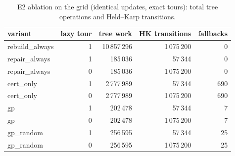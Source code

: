 \begin{table}[t]
\centering
\caption{E2 ablation on the grid (identical updates, exact tours): total tree operations and Held--Karp transitions.}
\label{tab:e2abl}
\small
\begin{tabular}{lrrrr}
\hline
variant & lazy tour & tree work & HK transitions & fallbacks \\
\hline
rebuild\_always & 1 & 10\,857\,296 & 1\,075\,200 & 0 \\
repair\_always & 1 & 185\,036 & 57\,344 & 0 \\
repair\_always & 0 & 185\,036 & 1\,075\,200 & 0 \\
cert\_only & 1 & 2\,777\,989 & 57\,344 & 690 \\
cert\_only & 0 & 2\,777\,989 & 1\,075\,200 & 690 \\
gp & 1 & 202\,478 & 57\,344 & 7 \\
gp & 0 & 202\,478 & 1\,075\,200 & 7 \\
gp\_random & 1 & 256\,595 & 57\,344 & 25 \\
gp\_random & 0 & 256\,595 & 1\,075\,200 & 25 \\
\hline
\end{tabular}
\end{table}
